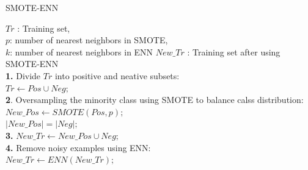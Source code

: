 \documentclass[italian,12pt,a4paper]{article}
\begin{document}
	\begin{algorithm}
		\caption{SMOTE-ENN}
		\begin{algorithmic}
			\Require $Tr$ : Training set, \\ $p$: number of nearest neighbors in SMOTE, \\ $k$: number of nearest neighbors in ENN
			\Ensure $New\_Tr$ : Training set after using SMOTE-ENN \\
			\textbf{1.} Divide $Tr$ into positive and neative subsets: \\ $Tr \leftarrow Pos \cup Neg;$  \\
			\textbf{2}. Oversampling the minority class using SMOTE to balance calss distribution: \\
			$New\_Pos \leftarrow SMOTE(Pos, p);$ \\
			$|New\_Pos| = |Neg|;$ \\
			\textbf{3.} $New\_Tr \leftarrow New\_Pos \cup Neg;$ \\
			\textbf{4.} Remove noisy examples using ENN: \\
			$New\_Tr \leftarrow ENN(New\_Tr);$
		\end{algorithmic}
	\end{algorithm}
\end{document}
